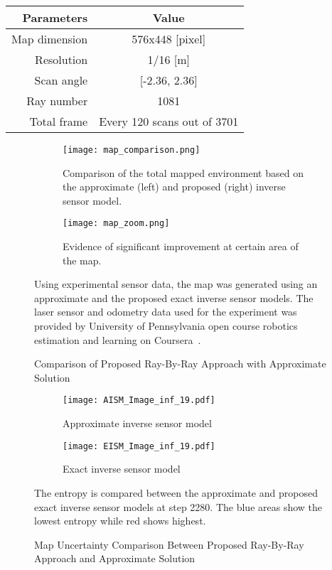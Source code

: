 \begin{center}
\label{tab:penn}
    \begin{tabular}{r | c}
        Parameters & Value\\ \hline\hline
        Map dimension & 576x448 [pixel]\\
        Resolution & 1/16 [m]\\
        Scan angle & [-2.36, 2.36]\\
        Ray number & 1081\\
        Total frame & Every 120 scans out of 3701\\
    \end{tabular}
\end{center}

\begin{figure}[!ht]
    \centering
    \begin{subfigure}[t]{0.8\columnwidth}
        \centering
        \texttt{[image: map\_comparison.png]}
        \caption{Comparison of the total mapped environment based on the approximate (left) and proposed (right) inverse sensor model.}
        \label{fig:penn_map_total}
    \end{subfigure}
    \begin{subfigure}[t]{0.8\columnwidth}
        \centering
        \texttt{[image: map\_zoom.png]}
        \caption{Evidence of significant improvement at certain area of the map.}
        \label{fig:penn_map_zoom}
    \end{subfigure}
    \caption{Comparison of Proposed Ray-By-Ray Approach with Approximate Solution}
	\medskip
	\small
	Using experimental sensor data, the map was generated using an approximate and the proposed exact inverse sensor models. The laser sensor and odometry data used for the experiment was provided by University of Pennsylvania open course robotics estimation and learning on Coursera~\cite{coursera}.
    \label{fig:penn_map}
\end{figure}


\begin{figure}[!ht]
    \centering
    \begin{subfigure}[t]{0.35\columnwidth}
        \centering
        \texttt{[image: AISM\_Image\_inf\_19.pdf]}
        \caption{Approximate inverse sensor model}
        \label{fig:AISM}
    \end{subfigure}
    \begin{subfigure}[t]{0.35\columnwidth}
        \centering
        \texttt{[image: EISM\_Image\_inf\_19.pdf]}
        \caption{Exact inverse sensor model}
        \label{fig:EISM}
    \end{subfigure}
    \caption{Map Uncertainty Comparison Between Proposed Ray-By-Ray Approach and Approximate Solution}
	\medskip
	\small
	The entropy is compared between the approximate and proposed exact inverse sensor models at step 2280. The blue areas show the lowest entropy while red shows highest.
\label{fig:entropy_comp}
\end{figure}


